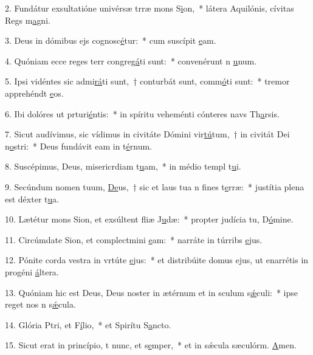 2. Fundátur exsultatióne univérsæ trræ mons S\uline{i}on,~* látera Aquilónis, cívitas Regs m\uline{a}gni.\par 
3. Deus in dómibus ejs cognosc\uline{é}tur:~* cum suscípit \uline{e}am.\par 
4. Quóniam ecce reges terr congreg\uline{á}ti sunt:~* convenérunt n \uline{u}num.\par 
5. Ipsi vidéntes sic admi\uline{rá}ti sunt,~† conturbát sunt, comm\uline{ó}ti sunt:~* tremor apprehéndt \uline{e}os.\par 
6. Ibi dolóres ut prturi\uline{é}ntis:~* in spíritu veheménti cónteres navs Th\uline{a}rsis.\par 
7. Sicut audívimus, sic vídimus in civitáte Dómini vir\uline{tú}tum,~† in civitát Dei n\uline{o}stri:~* Deus fundávit eam in t\uline{é}rnum.\par 
8. Suscépimus, Deus, misericrdiam t\uline{u}am,~* in médio templ t\uline{u}i.\par 
9. Secúndum nomen tuum, \uline{De}us,~† sic et laus tua n fines t\uline{e}rræ:~* justítia plena est déxter t\uline{u}a.\par 
10. Lætétur mons Sion, et exsúltent fliæ J\uline{u}dæ:~* propter judícia tu, D\uline{ó}mine.\par 
11. Circúmdate Sion, et complectmini \uline{e}am:~* narráte in túrribs \uline{e}jus.\par 
12. Pónite corda vestra in vrtúte \uline{e}jus:~* et distribúite domus ejus, ut enarrétis in progéni \uline{á}ltera.\par 
13. Quóniam hic est Deus, Deus noster in ætérnum et in sculum s\uline{ǽ}culi:~* ipse reget nos n s\uline{ǽ}cula.\par 
14. Glória Ptri, et F\uline{í}lio,~* et Spirítu S\uline{a}ncto.\par 
15. Sicut erat in princípio, t nunc, et s\uline{e}mper,~* et in sǽcula sæculórm. \uline{A}men.\par 
